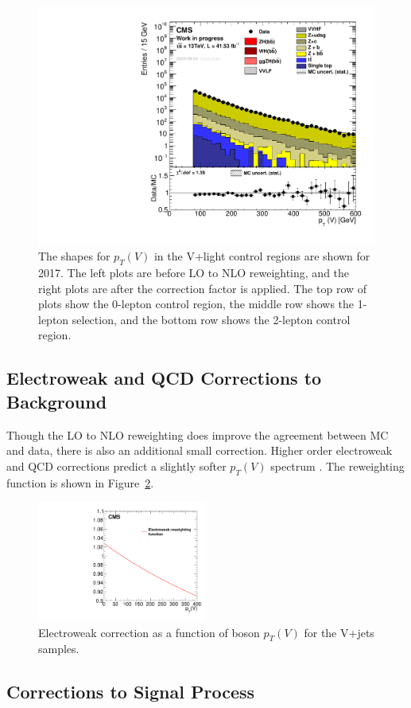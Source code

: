 \begin{figure}
  \includegraphics[width=0.45\linewidth]{figures/Vjets_NLOreweighting_2017V5_Zll_withWeight.pdf}
  \caption[LO to NLO reweighting shape comparisons]{
    The shapes for $p_T(V)$ in the V+light control regions are shown for 2017.
    The left plots are before LO to NLO reweighting,
    and the right plots are after the correction factor is applied.
    The top row of plots show the 0-lepton control region,
    the middle row shows the 1-lepton selection,
    and the bottom row shows the 2-lepton control region.
  }
  \label{fig:nlo-reweight}
\end{figure}

\subsection{Electroweak and QCD Corrections to Background}

Though the LO to NLO reweighting does improve the agreement between MC and data,
there is also an additional small correction.
Higher order electroweak and QCD corrections predict a slightly softer $p_T(V)$ spectrum
\cite{Kallweit_2016}.
The reweighting function is shown in Figure~\ref{fig:EWKcorr}.

\begin{figure}
  \centering
  \includegraphics[width=0.5\textwidth]{figures/EWKcorr.pdf}
  \caption[Electroweak corrections to background]{
    Electroweak correction as a function of boson $p_T(V)$ for the V+jets samples.
  }
  \label{fig:EWKcorr}
\end{figure}


\subsection{Corrections to Signal Process}

